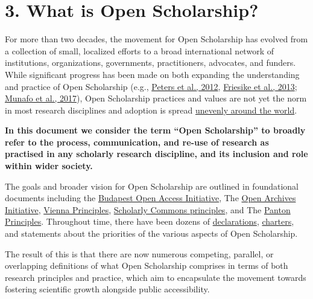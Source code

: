 \section{3. What is Open Scholarship? }\label{what-is-open-scholarship}

For more than two decades, the movement for Open Scholarship has evolved
from a collection of small, localized efforts to a broad international
network of institutions, organizations, governments, practitioners,
advocates, and funders. While significant progress has been made on both
expanding the understanding and practice of Open Scholarship (e.g.,
\href{https://www.routledge.com/Virtues-of-Openness-Education-Science-and-Scholarship-in-the-Digital/Peters-Roberts/p/book/9781594516863}{Peters
et al., 2012}, \href{https://doi.org/10.1007/s10961-014-9375-6}{Friesike
et al., 2013}; \href{https://doi.org/10.1038/s41562-016-0021}{Munafo et
al., 2017}), Open Scholarship practices and values are not yet the norm
in most research disciplines and adoption is spread
\href{http://knowledgegap.org/index.php/sub-projects/knowledge-and-power-inequality-in-open-science-policies/}{unevenly
around the world}.

\textbf{In this document we consider the term ``Open Scholarship'' to
broadly refer to the process, communication, and re-use of research as
practised in any scholarly research discipline, and its inclusion and
role within wider society.}

The goals and broader vision for Open Scholarship are outlined in
foundational documents including the
\href{http://www.budapestopenaccessinitiative.org/}{Budapest Open Access
Initiative}, The \href{https://www.openarchives.org/}{Open Archives
Initiative}, \href{https://viennaprinciples.org/}{Vienna Principles},
\href{https://www.force11.org/scholarly-commons/principles}{Scholarly
Commons principles}, and The
\href{https://en.wikipedia.org/wiki/Panton_Principles}{Panton
Principles}. Throughout time, there have been dozens of
\href{http://oad.simmons.edu/oadwiki/Declarations_in_support_of_OA}{declarations},
\href{http://tinyurl.com/scholcomm-charters}{charters}, and statements
about the priorities of the various aspects of Open Scholarship.

The result of this is that there are now numerous competing, parallel,
or overlapping definitions of what Open Scholarship comprises in terms
of both research principles and practice, which aim to encapsulate the
movement towards fostering scientific growth alongside public
accessibility.

